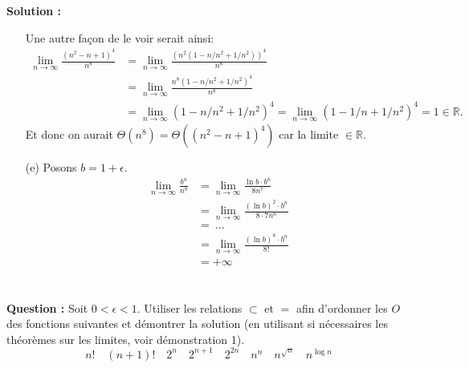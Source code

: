 \documentclass[11pt]{article} %
\newenvironment{question}[1][\unskip]{%
	\par
	\noindent
	\textbf{Question #1:}
	\noindent}
{\medskip}
\newenvironment{solution}[1][\unskip]{%
	\par
	\noindent
	\textbf{Solution #1:}
	\noindent}
{\medskip}
\begin{document}
\begin{solution}
\begin{itemize}
\vfill
Une autre façon de le voir serait ainsi:
\begin{align*}
\lim\limits_{n\rightarrow \infty} \frac{(n^2-n+1)^4}{n^8} &= \lim\limits_{n\rightarrow \infty} \frac{(n^2(1-n/n^2+1/n^2))^4}{n^8}\\
&=\lim\limits_{n\rightarrow \infty} \frac{n^8(1-n/n^2+1/n^2)^4}{n^8}\\ 
&= \lim\limits_{n\rightarrow \infty} (1-n/n^2+1/n^2)^4 = \lim\limits_{n\rightarrow \infty} (1-1/n+1/n^2)^4 =1  \in \mathbb{R} .
\end{align*}
Et donc on aurait $\Theta(n^8) = \Theta((n^2-n+1)^4)$ car la limite  $\in \mathbb{R}$.

\item[(e)]
		Posons $b=1+\epsilon$.
		\begin{align*}
		\lim\limits_{n\rightarrow \infty}\frac{b^n}{n^8}
		&=\lim\limits_{n\rightarrow \infty}\frac{\ln b\cdot  b^n}{8n^7}\\
		&=\lim\limits_{n\rightarrow \infty}\frac{(\ln b)^2\cdot  b^n}{8\cdot 7n^6}\\
		&=\ \dots\\
		&=\lim\limits_{n\rightarrow \infty}\frac{(\ln b)^8\cdot  b^n}{8!}\\
		&=+\infty
		\end{align*}
	\end{itemize}
\end{solution}

\section{}
\begin{question}
	Soit $0<\epsilon<1$. Utiliser les relations $\subset$ et $=$ afin d'ordonner les $O$ des fonctions suivantes et démontrer la solution (en utilisant si nécessaires les théorèmes sur les limites, voir démonstration 1).
	$$n! \quad (n+1)! \quad 2^n \quad 2^{n+1} \quad 2^{2n} \quad n^n \quad n^{\sqrt{n}} \quad n^{\log n}$$
\end{question}
\end{document}
